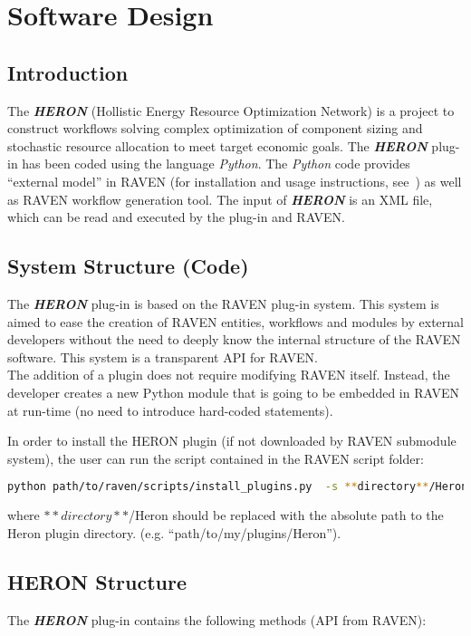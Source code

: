 \section{Software Design}
\subsection{Introduction}
The \textit{\textbf{HERON}} (Hollistic Energy Resource Optimization Network) is a project to construct workflows solving
complex optimization of component sizing and stochastic resource allocation to meet target economic goals.
The \textit{\textbf{HERON}} plug-in has been coded using the language \emph{Python}. The \emph{Python}
 code provides ``external model'' in RAVEN (for installation and usage instructions, see~\cite{RAVENuserManual}) as well as
RAVEN  workflow generation tool.
The input of  \textit{\textbf{HERON}} is an XML file, which can be read and executed by the plug-in and RAVEN.


\subsection{System Structure (Code)}
The  \textit{\textbf{HERON}} plug-in is based on the RAVEN plug-in system. This system is aimed to ease the creation
of RAVEN entities, workflows and modules by external developers without the need to deeply know the internal structure
of the RAVEN software. This system is a transparent API for RAVEN.
\\The addition of a plugin does not require modifying RAVEN itself. 
Instead, the developer creates a new Python module that is going to be embedded
 in RAVEN at run-time (no need to introduce  hard-coded statements).


In order to install the HERON plugin (if not downloaded by RAVEN submodule system),
 the user can run the script contained in the RAVEN script folder:
\begin{lstlisting}[language=bash]
 python path/to/raven/scripts/install_plugins.py  -s **directory**/Heron
\end{lstlisting}
where  $**directory**$/Heron should be replaced with the absolute path to the Heron plugin directory.
(e.g. ``path/to/my/plugins/Heron''). 

\subsection{HERON Structure}
The  \textit{\textbf{HERON}} plug-in contains the following methods (API from RAVEN):

